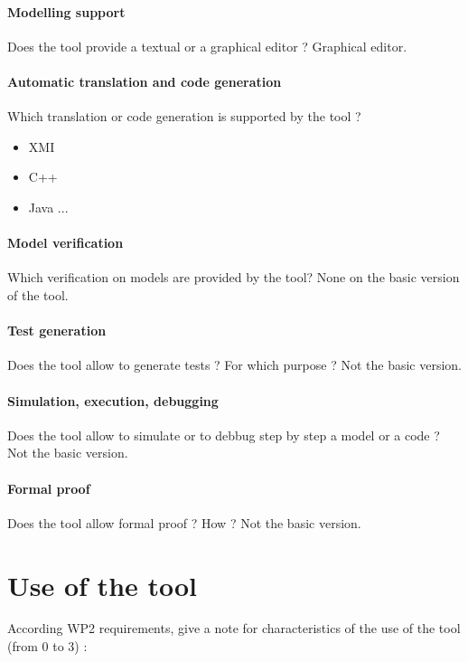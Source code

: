 \paragraph{Modelling support}
Does the tool provide a  textual or a graphical editor ? Graphical editor.

\paragraph{Automatic translation and code generation}
Which translation or code generation is supported by the tool ?
\begin{itemize}
\item XMI
\item C++
\item Java ...
\end{itemize}
\paragraph{Model verification}
Which verification on models are provided by the tool?
None on the basic version of the tool.
\paragraph{Test generation}
Does the tool allow to generate tests ? For  which purpose ?
Not the basic version.
\paragraph{Simulation, execution, debugging}
Does the tool allow to simulate or to debbug step by step a model or a code ?
Not the basic version.
\paragraph{Formal proof}
Does the tool allow formal proof ?  How ?
Not the basic version.


\section{Use of the tool}


According WP2 requirements, give a note for characteristics of the use of the tool (from 0 to 3) :

